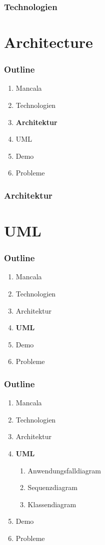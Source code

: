 \documentclass[
	10pt,
	t		%
]{beamer}
\begin{document}
\begin{frame}
\frametitle{Technologien}

\end{frame}

\section{Architecture}
\begin{frame}
\frametitle{Outline}
\begin{enumerate}
\item Mancala
\item Technologien
\item \textbf{Architektur}
\item UML
\item Demo
\item Probleme
\end{enumerate}
\end{frame}

\begin{frame}
\frametitle{Architektur}

\end{frame}

\section{UML}
\begin{frame}
\frametitle{Outline}
\begin{enumerate}
\item Mancala
\item Technologien
\item Architektur
\item \textbf{UML}
\item Demo
\item Probleme
\end{enumerate}
\end{frame}

\begin{frame}
\frametitle{Outline}
\begin{enumerate}
\item Mancala
\item Technologien
\item Architektur
\item \textbf{UML}
\begin{enumerate}
\item Anwendungsfalldiagram
\item Sequenzdiagram
\item Klassendiagram
\end{enumerate}
\item Demo
\item Probleme
\end{enumerate}
\end{frame}
\end{document}
